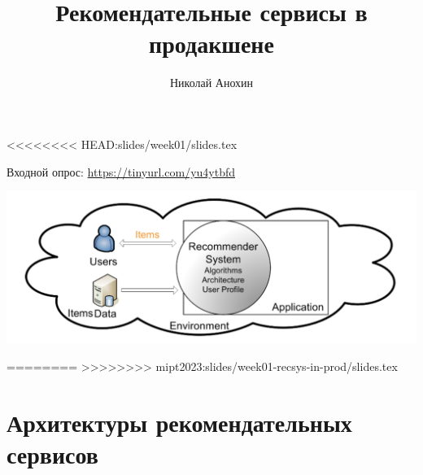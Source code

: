 \documentclass[11pt,aspectratio=169,handout]{beamer}
\author{Николай Анохин}
\title{Рекомендательные сервисы в продакшене}
\begin{document}
{

\begin{frame}
\titlepage
\end{frame}

}

<<<<<<<< HEAD:slides/week01/slides.tex
\begin{frame}{}
Входной опрос: \url{https://tinyurl.com/yu4ytbfd}
\begin{center}
\includegraphics[scale=0.35]{images/overall.png}
\end{center}
\end{frame}

========
>>>>>>>> mipt2023:slides/week01-recsys-in-prod/slides.tex
\section{Архитектуры рекомендательных сервисов}
\end{document}

